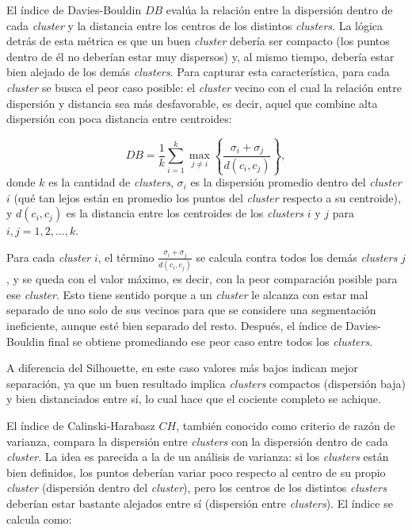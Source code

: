 \documentclass[a4paper,10pts,openany]{book}
\begin{document}
	El índice de Davies-Bouldin $DB$ evalúa la relación entre la dispersión dentro de cada \emph{cluster} y la distancia entre los centros de los distintos \emph{clusters}. La lógica detrás de esta métrica es que un buen \emph{cluster} debería ser compacto (los puntos dentro de él no deberían estar muy dispersos) y, al mismo tiempo, debería estar bien alejado de los demás \emph{clusters}. Para capturar esta característica, para cada \emph{cluster} se busca el peor caso posible: el \emph{cluster} vecino con el cual la relación entre dispersión y distancia sea más desfavorable, es decir, aquel que combine alta dispersión con poca distancia entre centroides:
	
	\begin{equation}
		DB = \frac{1}{k} \sum_{i=1}^{k} \max_{j \neq i} \left\{ \frac{\sigma_i + \sigma_j}{d(c_i, c_j)} \right\},
	\end{equation}
	donde $k$ es la cantidad de \emph{clusters}, $\sigma_i$ es la dispersión promedio dentro del \emph{cluster} $i$ (qué tan lejos están en promedio los puntos del \emph{cluster} respecto a su centroide), y $d(c_i, c_j)$ es la distancia entre los centroides de los \emph{clusters} $i$ y $j$ para $i,j=1,2,\dots,k$.
	
	Para cada \emph{cluster} $i$, el término $\frac{\sigma_i + \sigma_j}{d(c_i, c_j)}$ se calcula contra todos los demás \emph{clusters} $j$, y se queda con el valor máximo, es decir, con la peor comparación posible para ese \emph{cluster}. Esto tiene sentido porque a un \emph{cluster} le alcanza con estar mal separado de uno solo de sus vecinos para que se considere una segmentación ineficiente, aunque esté bien separado del resto. Después, el índice de Davies-Bouldin final se obtiene promediando ese peor caso entre todos los \emph{clusters}.
	
	A diferencia del Silhouette, en este caso valores más bajos indican mejor separación, ya que un buen resultado implica \emph{clusters} compactos (dispersión baja) y bien distanciados entre sí, lo cual hace que el cociente completo se achique.
	
	El índice de Calinski-Harabasz $CH$, también conocido como criterio de razón de varianza, compara la dispersión entre \emph{clusters} con la dispersión dentro de cada \emph{cluster}. La idea es parecida a la de un análisis de varianza: si los \emph{clusters} están bien definidos, los puntos deberían variar poco respecto al centro de su propio \emph{cluster} (dispersión dentro del \emph{cluster}), pero los centros de los distintos \emph{clusters} deberían estar bastante alejados entre sí (dispersión entre \emph{clusters}). El índice se calcula como:
	
\end{document}

